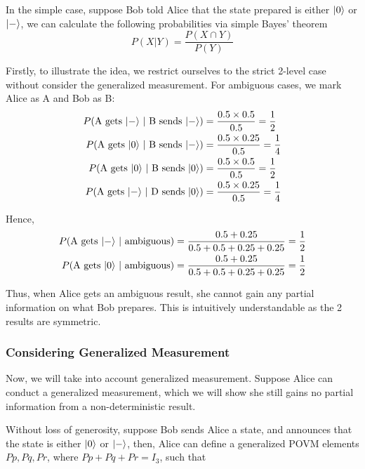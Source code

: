 \documentclass[%
 reprint,
superscriptaddress,
 amsmath,amssymb,
 aps,
]{revtex4-2}
\begin{document}
In the simple case, suppose Bob told Alice that the state prepared is either $\ket{0}$ or $\ket{-}$, we can calculate the following probabilities via simple Bayes' theorem 
\begin{equation}
    P(X|Y) = \frac{P(X \cap Y)}{P(Y)}
\end{equation}

Firstly, to illustrate the idea, we restrict ourselves to the strict 2-level case without consider the generalized measurement. For ambiguous cases, we mark Alice as A and Bob as B:
\begin{equation}
    \begin{split}
        P(\text{A gets $\ket{-}$ $|$ B sends $\ket{-}$})&=\frac{0.5\times 0.5}{0.5}=\frac{1}{2}\\
        P(\text{A gets $\ket{0}$ $|$ B sends $\ket{-}$})&=\frac{0.5\times 0.25}{0.5}=\frac{1}{4}\\
        P(\text{A gets $\ket{0}$ $|$ B sends $\ket{0}$})&=\frac{0.5\times 0.5}{0.5}=\frac{1}{2}\\
        P(\text{A gets $\ket{-}$ $|$ D sends $\ket{0}$})&=\frac{0.5\times 0.25}{0.5}=\frac{1}{4}\\
    \end{split}
\end{equation}

Hence, 
\begin{equation}
    \begin{split}
        P(\text{A gets $\ket{-}$ $|$ ambiguous})&=\frac{0.5+0.25}{0.5+0.5+0.25+0.25}=\frac{1}{2}\\
        P(\text{A gets $\ket{0}$ $|$ ambiguous})&=\frac{0.5+0.25}{0.5+0.5+0.25+0.25}=\frac{1}{2}\\
    \end{split}
\end{equation}

Thus, when Alice gets an ambiguous result, she cannot gain any partial information on what Bob prepares. This is intuitively understandable as the 2 results are symmetric. 

\subsubsection{Considering Generalized Measurement}
Now, we will take into account generalized measurement. Suppose Alice can conduct a generalized measurement, which we will show she still gains no partial information from a non-deterministic result.

Without loss of generosity, suppose Bob sends Alice a state, and announces that the state is either $\ket{0}$ or $\ket{-}$, then, Alice can define a generalized POVM elements $Pp, Pq, Pr$, where $Pp+Pq+Pr=I_3$, such that 
\end{document}
